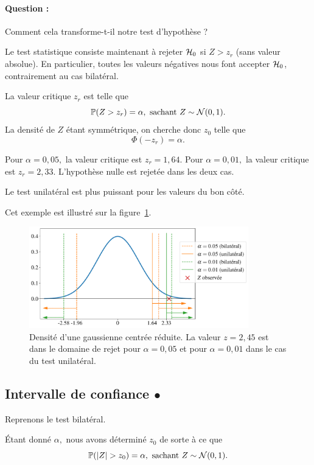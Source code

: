 \paragraph{Question :} Comment cela transforme-t-il notre test d'hypothèse ?
\begin{answer}
  Le test statistique consiste maintenant à rejeter $\mathcal{H}_0$ si $Z > z_r$ (sans
  valeur absolue). En particulier, toutes les valeurs négatives nous font
  accepter $\mathcal{H}_0$, contrairement au cas bilatéral.
  
  La valeur critique $z_r$ est telle que 
  \[
    \mathbb{P}(Z > z_r) = \alpha, \text{ sachant } Z \sim \mathcal{N}(0, 1).
  \]
  La densité de $Z$ étant symmétrique, on cherche donc $z_0$ telle que 
  \[
    \Phi(-z_r) = \alpha.
  \]
  
  Pour $\alpha = 0,05,$ la valeur critique est $z_r = 1,64.$ Pour
  $\alpha = 0,01,$ la valeur critique est $z_r = 2,33.$ L'hypothèse nulle est
  rejetée dans les deux cas.

  Le test unilatéral est plus puissant pour les valeurs du bon côté.

  Cet exemple est illustré sur la figure~\ref{fig:z_pigeons_unilateral}.
\end{answer}


\begin{figure}[h]
  \centering
  \includegraphics[width=0.85\textwidth]{figures/tests/z_pigeons_unilateral}
  \caption{Densité d'une gaussienne centrée réduite. La valeur $z=2,45$ est
    dans le domaine de rejet pour $\alpha = 0,05$ et pour $\alpha = 0,01$ dans
    le cas du test unilatéral.}
  \label{fig:z_pigeons_unilateral}
\end{figure}

\subsection{Intervalle de confiance $\bullet$}
\label{sec:ic}
Reprenons le test bilatéral.

Étant donné $\alpha,$ nous avons déterminé $z_0$ de sorte à ce que
\[
  \mathbb{P}(\lvert Z\rvert > z_0) = \alpha, \text{ sachant } Z \sim \mathcal{N}(0, 1).
\]

